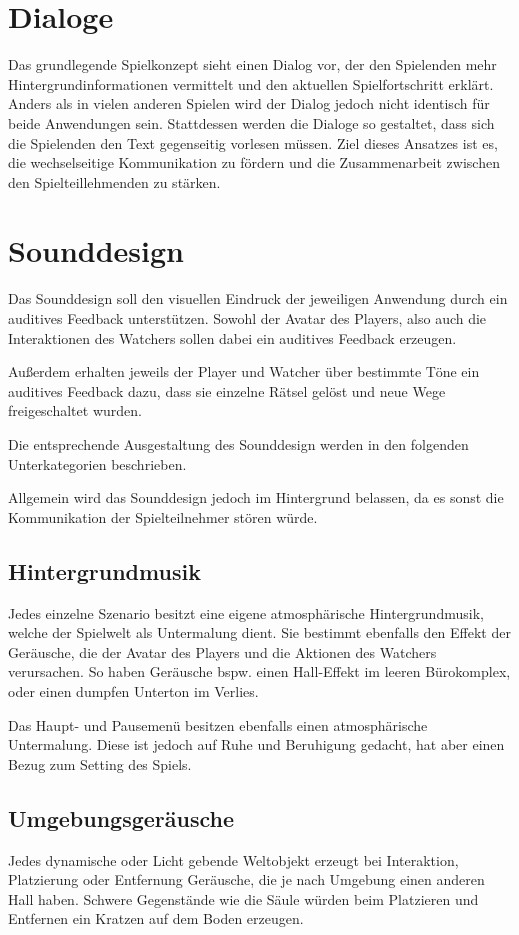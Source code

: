 \section{Dialoge}
Das grundlegende Spielkonzept sieht einen Dialog vor, der den Spielenden mehr Hintergrundinformationen vermittelt und den aktuellen Spielfortschritt erklärt. Anders als in vielen anderen Spielen wird der Dialog jedoch nicht identisch für beide Anwendungen sein. Stattdessen werden die Dialoge so gestaltet, dass sich die Spielenden den Text gegenseitig vorlesen müssen. Ziel dieses Ansatzes ist es, die wechselseitige Kommunikation zu fördern und die Zusammenarbeit zwischen den Spielteillehmenden zu stärken.

\section{Sounddesign}
Das Sounddesign soll den visuellen Eindruck der jeweiligen Anwendung durch ein auditives Feedback unterstützen. Sowohl der Avatar des Players, also auch die Interaktionen des Watchers sollen dabei ein auditives Feedback erzeugen.

Außerdem erhalten jeweils der Player und Watcher über bestimmte Töne ein auditives Feedback dazu, dass sie einzelne Rätsel gelöst und neue Wege freigeschaltet wurden.

Die entsprechende Ausgestaltung des Sounddesign werden in den folgenden Unterkategorien beschrieben.

Allgemein wird das Sounddesign jedoch im Hintergrund belassen, da es sonst die Kommunikation der Spielteilnehmer stören würde.

\subsection{Hintergrundmusik}
Jedes einzelne Szenario besitzt eine eigene atmosphärische Hintergrundmusik, welche der Spielwelt als Untermalung dient. Sie bestimmt ebenfalls den Effekt der Geräusche, die der Avatar des Players und die Aktionen des Watchers verursachen. So haben Geräusche bspw. einen Hall-Effekt im leeren Bürokomplex, oder einen dumpfen Unterton im Verlies.

Das Haupt- und Pausemenü besitzen ebenfalls einen atmosphärische Untermalung. Diese ist jedoch auf Ruhe und Beruhigung gedacht, hat aber einen Bezug zum Setting des Spiels.

\subsection{Umgebungsgeräusche}
Jedes dynamische oder Licht gebende Weltobjekt erzeugt bei Interaktion, Platzierung oder Entfernung Geräusche, die je nach Umgebung einen anderen Hall haben. Schwere Gegenstände wie die Säule würden beim Platzieren und Entfernen ein Kratzen auf dem Boden erzeugen. 


